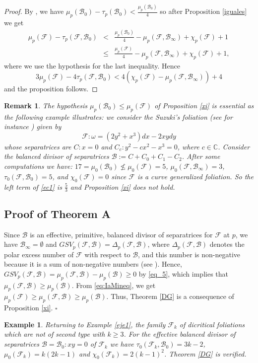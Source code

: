 \documentclass[11pt]{amsart}
\newcommand{\C}{\mathbb{C}}
\newcommand{\F}{\mathcal{F}}
\newcommand{\B}{\mathcal{B}}
\newtheorem{example}[theorem]{Example}
\newtheorem{remark}[theorem]{Remark}
\begin{document}
\begin{proof}  
By \cite[Theorem 3.2]{Almiron}, we have
$
\mu_{p}(\mathcal{B}_{0})-\tau_{p}(\mathcal{B}_{0}) <  \frac{\mu_{p}(\mathcal{B}_{0})}{4}
$
so  after Proposition \ref{iguales} we get
\begin{eqnarray*}
\mu_{p}(\mathcal{F})-\tau_{p}(\mathcal{F},\mathcal{B}_{0})&<&\frac{\mu_{p}(\mathcal{B}_{0})}{4}-\mu_p(\F,\B_{\infty})+\chi_{p}(\mathcal{F})+1\\
&\leq&\frac{\mu_{p}(\mathcal{F})}{4}-\mu_p(\F,\B_{\infty})+\chi_{p}(\mathcal{F})+1,
\end{eqnarray*}
where we use the hypothesis for the last inequality. Hence
\[
3\mu_p(\F)-4\tau_p(\F,\B_0)<4\left(\chi_p(\F)-\mu_p(\F,\B_{\infty})\right)+4
\]
and the proposition follows.
\end{proof}
\begin{remark}
The hypothesis $\mu_{p}(\mathcal{B}_{0}) \leq \mu_{p}(\mathcal{F})$ of Proposition \ref{xi} is essential as the following example illustrates: we consider the Suzuki's foliation (see for instance \cite[p. 75]{Cerveau-Mattei}) given by \[\F:\omega=(2y^2+x^3)dx-2xy dy\] whose separatrices are $C:x=0$ and $C_c:y^2-cx^2-x^3=0$, where $c\in \C$. Consider the balanced divisor of separatrices $\B:=C+C_0+C_1-C_2$.
After some computations we have: $17=\mu_0(\B_0)\not\leq  \mu_0(\F)=5$, $\mu_0(\F,\B_{\infty})=3$, $\tau_0(\F,\B_0)=5$, and $\chi_{0}(\F)=0$ since $\F$ is a curve generalized foliation. So the left term of \eqref{ec1} is $\frac{5}{3}$ and Proposition \ref{xi} does not hold.
\end{remark}
\subsection{Proof of Theorem A} 
Since $\B$ is an effective, primitive, balanced divisor of separatrices for $\F$ at $p$, we have $\B_{\infty}=\emptyset$ and $GSV_{p}(\mathcal{F},\B)=\Delta_p(\mathcal{F},\B)$, where $\Delta_p(\mathcal{F},\B)$ denotes the polar excess number of $\mathcal F$ with respect to $\B$, and this number is non-negative because it is a sum of non-negative numbers (see \cite[Equality(3.12)]{FP-M}).  Hence, $GSV_p(\F,\B)=\mu_p(\F,\B)-\mu_p(\B)\geq 0$ by \eqref{eq_5}, which implies that $\mu_p(\F,\B)\geq \mu_p(\B)$.
From \eqref{eq:IaMineq}, we get $\mu_p(\F)\geq \mu_p(\F,\B)\geq \mu_p(\B)$. Thus, Theorem \ref{DG} is a consequence of Proposition \ref{xi}. $\square$

\begin{example}
Returning to  Example \ref{eje1}, the family $\F_k$ of dicritical foliations which are not of second type with $k\geq 3$. For the effective  balanced divisor of separatrices $\mathcal B=\mathcal B_0: xy=0$ of $\F_k$ we have $\tau_0(\F_k, \B_{0})=3k-2$, $\mu_0(\F_k)=k(2k-1)$ and $\chi_0(\F_k)=2(k-1)^{2}$. Theorem  \ref{DG} is verified.
\end{example}
\end{document}
